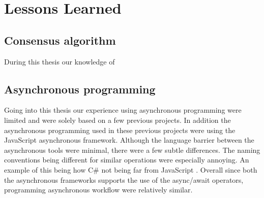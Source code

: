 \section{Lessons Learned}
\iffalse
-PBFT
-Asynchronous programming with C#, Task architecture
-Reactive Programming basics
-Overall knowledge for Cleipnir
-Issues and advantages in regards to the topics listed over. For instance a lot of time was wasted due to not fully grasping how Cleipnir work internally when performing the reactive part and the CAwaitable emission --> resulting a month of frustration trying to figure out why collision errors occur.
-Lack of documentation can be quite fatal for continued support.
-The multitude of potential issues that could occur that aren't necessary dealt with in the theoretical consensus algorithm or pseudo code.
-Cleipnir and how it interacts with the other programming paradigms. Eks: A clear distinction has to made in regards to what code is run inside Cleipnir(the persistent part) and what is not called in Cleipnir (orthogonal part), mixing these will cause disastrous results, which we infact encountered several times during implementation.
\fi

\subsection{Consensus algorithm}
During this thesis our knowledge of 

\subsection{Asynchronous programming}
Going into this thesis our experience using asynchronous programming were limited and were solely based on a few previous projects. In addition the asynchronous programming used in these previous projects were using the JavaScript asynchronous framework. Although the language barrier between the asynchronous tools were minimal, there were a few subtle differences. The naming conventions being different for similar operations were especially annoying. An example of this being how C\#  not being far from JavaScript . Overall since both the asynchronous frameworks supports the use of the async/await operators, programming asynchronous workflow were relatively similar. 

